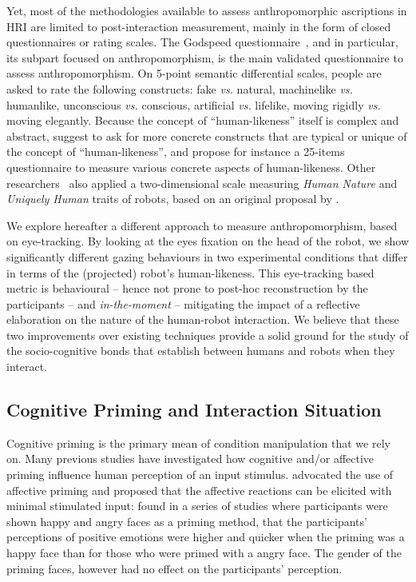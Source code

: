 \documentclass[lettersize, noapacite, twoside, HRI]{apa_HRI}
\newcommand{\vs}{\textit{vs.}\xspace}
\begin{document}
Yet, most of the methodologies available to assess anthropomorphic ascriptions
in HRI are limited to post-interaction measurement, mainly in the form of closed
questionnaires or rating scales. The Godspeed
questionnaire~\citep{bartneck_measurement_2008}, and in particular, its subpart
focused on anthropomorphism, is the main validated questionnaire to assess
anthropomorphism. On 5-point semantic differential scales, people are asked to
rate the following constructs: fake \vs natural, machinelike \vs humanlike,
unconscious \vs conscious, artificial \vs lifelike, moving rigidly \vs moving
elegantly. Because the concept of ``human-likeness'' itself is complex and
abstract, \citet{kahn_jr._robotic_2006} suggest to ask for more concrete
constructs that are typical or unique of the concept of ``human-likeness'', and
\citet{ruijten_introducing_2014} propose for instance a 25-items questionnaire to
measure various concrete aspects of human-likeness. Other
researchers~\citep{zlotowski2014dimensions,salem2015would} also applied a
two-dimensional scale measuring \emph{Human Nature} and \emph{Uniquely Human}
traits of robots, based on an original proposal by
\citet{haslam2008attributing}.

We explore hereafter a different approach to measure anthropomorphism, based on
eye-tracking. By looking at the eyes fixation on the head of the robot, we show
significantly different gazing behaviours in two experimental conditions that
differ in terms of the (projected) robot's human-likeness. This eye-tracking
based metric is behavioural -- hence not prone to post-hoc reconstruction by the
participants -- and \emph{in-the-moment} -- mitigating the impact of a reflective
elaboration on the nature of the human-robot interaction. We believe that these
two improvements over existing techniques provide a solid ground for the study
of the socio-cognitive bonds that establish between humans and robots when they
interact.

\subsection{Cognitive Priming and Interaction Situation}
\label{cognitive-priming}

Cognitive priming is the primary mean of condition manipulation that we rely on.
Many previous studies have investigated how cognitive and/or affective priming
influence human perception of an input stimulus. \cite{zajonc1980feeling}
advocated the use of affective priming and proposed that the affective reactions
can be elicited with minimal stimulated input: \cite{murphy1993affect} found in
a series of studies where participants were shown happy and angry faces as a
priming method, that the participants' perceptions of positive emotions were
higher and quicker when the priming was a happy face than for those who were
primed with a angry face. The gender of the priming faces, however had no effect
on the participants' perception.
\end{document}
